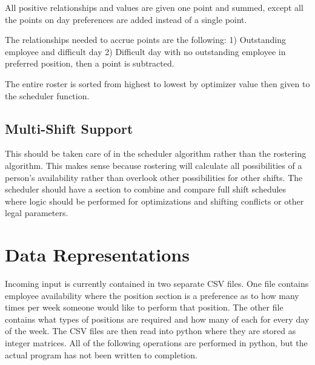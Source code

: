 \documentclass[letter,11pt]{article}
\begin{document}
All positive relationships and values are given one point and summed, except all the points on day preferences are added instead of a single point.

The relationships needed to accrue points are the following:
1) Outstanding employee and difficult day
2) Difficult day with no outstanding employee in preferred position, then a point is subtracted.

The entire roster is sorted from highest to lowest by optimizer value then given to the scheduler function.

\subsection{Multi-Shift Support}

This should be taken care of in the scheduler algorithm rather than the rostering algorithm.
This makes sense because rostering will calculate all possibilities of a person's availability rather than overlook other possibilities for other shifts.
The scheduler should have a section to combine and compare full shift schedules where logic should be performed for optimizations and shifting conflicts or other legal parameters.

\section{Data Representations}

Incoming input is currently contained in two separate CSV files. 
One file contains employee availability where the position section is a preference as to how many times per week someone would like to perform that position. The other file contains what types of positions are required and how many of each for every day of the week.
The CSV files are then read into python where they are stored as integer matrices.
All of the following operations are performed in python, but the actual program has not been written to completion.
\end{document}

